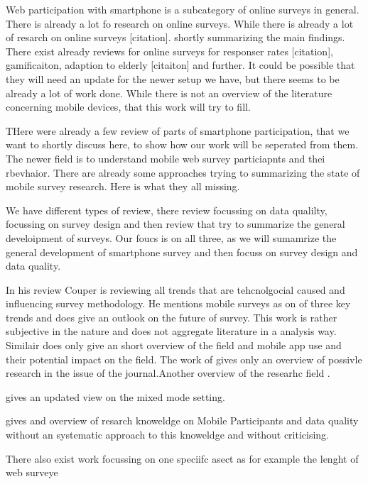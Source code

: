 Web participation with smartphone is a subcategory of online surveys in general. There is already a lot fo research on online surveys. While there is already a lot of resarch on online surveys [citation]. shortly summarizing the main findings. There exist already reviews for online surveys for responser rates [citation], gamificaiton, adaption to elderly [citaiton] and further. It could be possible that they will need an update for the newer setup we have, but there seems to be already a lot of work done. While there is not an overview of the literature concerning mobile devices, that this work will try to fill.

THere were already a few review of parts of smartphone participation, that we want to shortly discuss here, to show how our work will be seperated from them. The newer field is to understand mobile web survey particiapnts and thei rbevhaior. There are already some approaches trying to summarizing the state of mobile survey research. Here is what they all missing. 

We have different types of review, there review focussing on data qualilty, focussing on survey design and then review that try to summarize the general develoipment of surveys. Our foucs is on all three, as we will sumamrize the general development of smartphone survey and then focuss on survey design and data quality. 

In his review Couper \cite{couper_is_2013} is reviewing all trends that are tehcnolgocial caused and influencing survey methodology. He mentions mobile surveys as on of three key trends and does give an outlook on the future of survey. This work is rather subjective in the nature and does not aggregate literature in a analysis way. Similair \cite{callegaro_mixed-mode_2013} does only give an short overview of the field and mobile app use and their potential impact on the field.
The work of \cite{toepoel_online_2015} gives only an overview of possivle research in the issue of the journal.Another overview of the researhc field \cite{link_mobile_2014}. 

\cite{deleeuw_mixed-mode_2018} gives an updated view on the mixed mode setting.

\cite{wells_what_2015} gives and overview of resarch knoweldge on Mobile Participants and data quality without an systematic approach to this knoweldge and without criticising. 

There also exist work focussing on one speciifc asect as for example the lenght of web surveye \cite{couper_why_2017}

